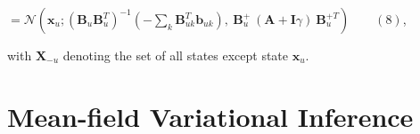 \begin{par}
$= \mathcal{N}\left(\mathbf{x}_u ; \left( \mathbf{B}_{u} \mathbf{B}_{u}^T \right)^{-1} \left( - \sum_k \mathbf{B}_{uk}^T \mathbf{b}_{uk} \right), ~\mathbf{B}_{u}^{+} ~ (\mathbf{A} + \mathbf{I}\gamma) ~ \mathbf{B}_u^{+T} \right) \qquad (8)$,
\end{par} \vspace{1em}
\begin{par}
with $\mathbf{X}_{-u}$ denoting the set of all states except state $\mathbf{x}_u$.
\end{par} \vspace{1em}


\section{Mean-field Variational Inference}

